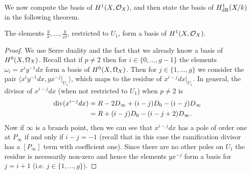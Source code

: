 We now compute the basis of $H^1(X,{\cal O}_X)$, and then state the basis of $H_{\text {dR}}^1(X/k)$ in the following theorem.
\begin{lem}\label{basish1}
 
 The elements $\frac{y}{x}, \ldots , \frac{y}{x^g}$, restricted to $U_1$, form a basis of $H^1(X,{\cal O}_X)$.
 
\end{lem}
\begin{proof}
We use Serre duality and the fact that we already know a basis of ${H^0(X,\Omega_X)}$.
Recall that if $p\neq 2$ then for $i \in \{0,\ldots, g-1\}$ the elements $\omega_i = x^iy^{-1}dx$ form a basis of ${H^0(X,\Omega_X)}$.
Then for $j\in \{1, \ldots, g\}$  we consider the pair $\langle x^iy^{-1}dx, yx^{-j}|_{U_1}\rangle$, which maps to the residue of $x^{i-j}dx|_{U_1}$.
In general, the divisor of $x^{i-j}dx$ (when not restricted to $U_1$) when $p\neq 2$ is
\begin{equation}\label{residuedivisor}
\begin{split}
\operatorname{div}(x^{i-j}dx) & = R - 2D_\infty +(i-j)D_0 - (i-j)D_\infty \\
& = R + (i-j)D_0 - (i-j+2)D_\infty.
\end{split}
\end{equation}
Now if $\infty$ is a branch point, then we can see that $x^{i-j}dx$ has a pole of order one at $P_\infty$ if and only if $i-j = -1$ (recall that in this case the ramification divisor has a $[P_\infty]$ term with coefficient one).
Since there are no other poles on $U_1$ the residue is necessarily non-zero and hence the elements $yx^{-j}$ form a basis for $j= i+1$ (i.e. $j \in \{1, \ldots, g\}$).


\end{proof}
